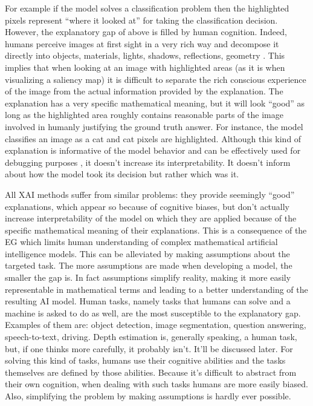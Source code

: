 For example if the model solves a classification problem then the highlighted pixels represent “where it looked at” for taking the classification decision.
However, the explanatory gap of above is filled by human cognition.
Indeed, humans perceive images at first sight in a very rich way and decompose it directly into objects, materials, lights, shadows, reflections, geometry \cite{pinker2009mind}.
This implies that when looking at an image with highlighted areas (as it is when visualizing a saliency map) it is difficult to separate the rich conscious experience of the image from the actual information provided by the explanation.
The explanation has a very specific mathematical meaning, but it will look “good” as long as the highlighted area roughly contains reasonable parts of the image involved in humanly justifying the ground truth answer.
For instance, the model classifies an image as a cat and cat pixels are highlighted.
Although this kind of explanation is informative of the model behavior and can be 
effectively used for debugging purposes \cite{molnar2022}, it doesn't increase its interpretability.
It doesn't inform about how the model took its decision but rather which was it. 

All XAI methods suffer from similar problems: they provide seemingly “good” explanations, which appear so because of cognitive biases, but don't actually increase interpretability of the model on which they are applied because of the specific mathematical meaning of their explanations.
This is a consequence of the EG which limits human understanding of complex mathematical artificial intelligence models.
This can be alleviated by making assumptions about the targeted task.
The more assumptions are made when developing a model, the smaller the gap is.
In fact assumptions simplify reality, making it more easily representable in mathematical terms and leading to a better understanding of the resulting AI model.
Human tasks, namely tasks that humans can solve and a machine is asked to do as well, are the most susceptible to the explanatory gap.
Examples of them are: object detection, image segmentation, question answering, speech-to-text, driving.
Depth estimation is, generally speaking, a human task, but, if one thinks more carefully, it probably isn't.
It'll be discussed later.
For solving this kind of tasks, humans use their cognitive abilities and the tasks themselves are defined by those abilities.
Because it's difficult to abstract from their own cognition, when dealing with such tasks humans are more easily biased.
Also, simplifying the problem by making assumptions is hardly ever possible.

